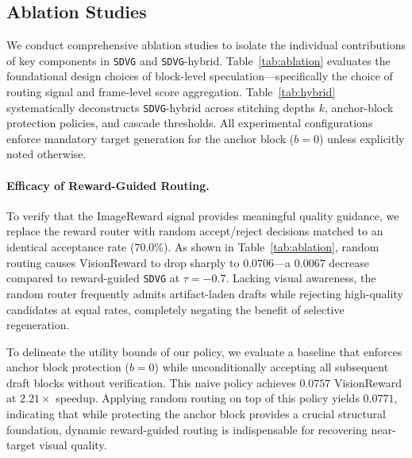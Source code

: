 \documentclass{article} %
\newcommand{\threshold}{\tau}
\begin{document}

\subsection{Ablation Studies}
\label{sec:ablation}

We conduct comprehensive ablation studies to isolate the individual contributions of key components in \texttt{SDVG} and \texttt{SDVG}-hybrid. Table~\ref{tab:ablation} evaluates the foundational design choices of block-level speculation—specifically the choice of routing signal and frame-level score aggregation. Table~\ref{tab:hybrid} systematically deconstructs \texttt{SDVG}-hybrid across stitching depths $k$, anchor-block protection policies, and cascade thresholds. All experimental configurations enforce mandatory target generation for the anchor block ($b=0$) unless explicitly noted otherwise.

\paragraph{Efficacy of Reward-Guided Routing.}
To verify that the ImageReward signal provides meaningful quality guidance, we replace the reward router with random accept/reject decisions matched to an identical acceptance rate ($70.0\%$). As shown in Table~\ref{tab:ablation}, random routing causes VisionReward to drop sharply to $0.0706$—a $0.0067$ decrease compared to reward-guided \texttt{SDVG} at $\threshold = -0.7$. Lacking visual awareness, the random router frequently admits artifact-laden drafts while rejecting high-quality candidates at equal rates, completely negating the benefit of selective regeneration. 

To delineate the utility bounds of our policy, we evaluate a baseline that enforces anchor block protection ($b=0$) while unconditionally accepting all subsequent draft blocks without verification. This naive policy achieves $0.0757$ VisionReward at $2.21\times$ speedup. Applying random routing on top of this policy yields $0.0771$, indicating that while protecting the anchor block provides a crucial structural foundation, dynamic reward-guided routing is indispensable for recovering near-target visual quality.
\end{document}
